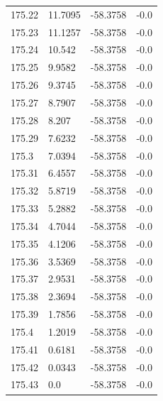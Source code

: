 \begin{table}[H]
\begin{tabular}{llll}
175.22 & 11.7095 & -58.3758 & -0.0 \\
175.23 & 11.1257 & -58.3758 & -0.0 \\
175.24 & 10.542 & -58.3758 & -0.0 \\
175.25 & 9.9582 & -58.3758 & -0.0 \\
175.26 & 9.3745 & -58.3758 & -0.0 \\
175.27 & 8.7907 & -58.3758 & -0.0 \\
175.28 & 8.207 & -58.3758 & -0.0 \\
175.29 & 7.6232 & -58.3758 & -0.0 \\
175.3 & 7.0394 & -58.3758 & -0.0 \\
175.31 & 6.4557 & -58.3758 & -0.0 \\
175.32 & 5.8719 & -58.3758 & -0.0 \\
175.33 & 5.2882 & -58.3758 & -0.0 \\
175.34 & 4.7044 & -58.3758 & -0.0 \\
175.35 & 4.1206 & -58.3758 & -0.0 \\
175.36 & 3.5369 & -58.3758 & -0.0 \\
175.37 & 2.9531 & -58.3758 & -0.0 \\
175.38 & 2.3694 & -58.3758 & -0.0 \\
175.39 & 1.7856 & -58.3758 & -0.0 \\
175.4 & 1.2019 & -58.3758 & -0.0 \\
175.41 & 0.6181 & -58.3758 & -0.0 \\
175.42 & 0.0343 & -58.3758 & -0.0 \\
175.43 & 0.0 & -58.3758 & -0.0 \\
\bottomrule
\end{tabular}

\end{table}
